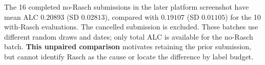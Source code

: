 The 16 completed no-Rasch submissions in the later platform screenshot have mean ALC $0.20893$ (SD $0.02813$), compared with $0.19107$ (SD $0.01105$) for the 10 with-Rasch evaluations. The cancelled submission is excluded. These batches use different random draws and dates; only total ALC is available for the no-Rasch batch. \textbf{This unpaired comparison} motivates retaining the prior submission, but cannot identify Rasch as the cause or locate the difference by label budget.
